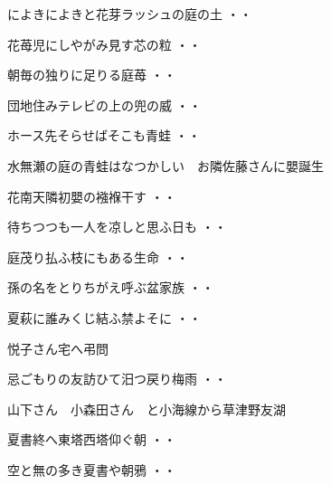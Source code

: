 \begin{shiika}によきによきと花芽ラッシュの庭の土
\hfill{・・}\end{shiika}
\begin{shiika}花苺児にしやがみ見す芯の粒
\hfill{・・}\end{shiika}
\begin{shiika}朝毎の独りに足りる庭苺
\hfill{・・}\end{shiika}
\begin{shiika}団地住みテレビの上の兜の威
\hfill{・・}\end{shiika}
\begin{shiika}ホース先そらせばそこも青蛙
\hfill{・・}\end{shiika}
\vspace{0.6cm}
水無瀬の庭の青蛙はなつかしい　お隣佐藤さんに嬰誕生
\begin{shiika}花南天隣初嬰の襁褓干す
\hfill{・・}\end{shiika}
\begin{shiika}待ちつつも一人を凉しと思ふ日も
\hfill{・・}\end{shiika}
\begin{shiika}庭茂り払ふ枝にもある生命
\hfill{・・}\end{shiika}
\begin{shiika}孫の名をとりちがえ呼ぶ盆家族
\hfill{・・}\end{shiika}
\begin{shiika}夏萩に誰みくじ結ふ禁よそに
\hfill{・・}\end{shiika}
\vspace{0.6cm}
悦子さん宅へ弔問
\begin{shiika}忌ごもりの友訪ひて汨つ戻り梅雨
\hfill{・・}\end{shiika}
\vspace{0.6cm}
山下さん　小森田さん　と小海線から草津野友湖
\begin{shiika}夏書終へ東塔西塔仰ぐ朝
\hfill{・・}\end{shiika}
\begin{shiika}空と無の多き夏書や朝鴉
\hfill{・・}\end{shiika}
